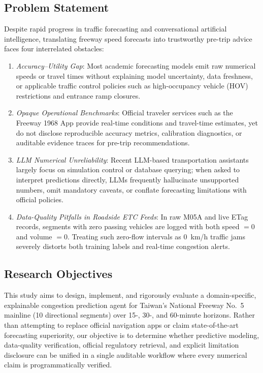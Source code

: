\documentclass[conference]{IEEEtran}
\begin{document}
\subsection{Problem Statement}
Despite rapid progress in traffic forecasting and conversational artificial intelligence, translating freeway speed forecasts into trustworthy pre-trip advice faces four interrelated obstacles:
\begin{enumerate}
    \item \emph{Accuracy--Utility Gap}: Most academic forecasting models emit raw numerical speeds or travel times without explaining model uncertainty, data freshness, or applicable traffic control policies such as high-occupancy vehicle (HOV) restrictions and entrance ramp closures.
    \item \emph{Opaque Operational Benchmarks}: Official traveler services such as the Freeway 1968 App provide real-time conditions and travel-time estimates, yet do not disclose reproducible accuracy metrics, calibration diagnostics, or auditable evidence traces for pre-trip recommendations.
    \item \emph{LLM Numerical Unreliability}: Recent LLM-based transportation assistants largely focus on simulation control or database querying; when asked to interpret predictions directly, LLMs frequently hallucinate unsupported numbers, omit mandatory caveats, or conflate forecasting limitations with official policies.
    \item \emph{Data-Quality Pitfalls in Roadside ETC Feeds}: In raw M05A and live ETag records, segments with zero passing vehicles are logged with both speed $= 0$ and volume $= 0$. Treating such zero-flow intervals as 0~km/h traffic jams severely distorts both training labels and real-time congestion alerts.
\end{enumerate}

\subsection{Research Objectives}
This study aims to design, implement, and rigorously evaluate a domain-specific, explainable congestion prediction agent for Taiwan's National Freeway No.~5 mainline (10 directional segments) over 15-, 30-, and 60-minute horizons. Rather than attempting to replace official navigation apps or claim state-of-the-art forecasting superiority, our objective is to determine whether predictive modeling, data-quality verification, official regulatory retrieval, and explicit limitation disclosure can be unified in a single auditable workflow where every numerical claim is programmatically verified.
\end{document}
